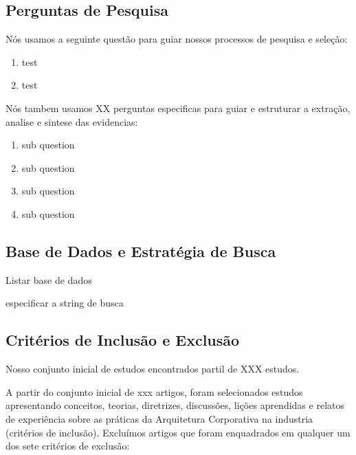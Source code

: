 \subsection{Perguntas de Pesquisa}
Nós usamos a seguinte questão para guiar nossos processos de pesquisa e seleção:

\begin{enumerate}
    \item test
    \item test
\end{enumerate}

Nós tambem usamos XX perguntas especificas para guiar e estruturar a extração, analise e sintese das evidencias:

\begin{enumerate}
    \item sub question
    \item sub question
    \item sub question
    \item sub question
\end{enumerate}

\subsection{Base de Dados e Estratégia de Busca}

Listar base de dados

especificar a string de busca

\subsection{Critérios de Inclusão e Exclusão}

Nosso conjunto inicial de estudos encontrados partil de XXX estudos. 

A partir do conjunto inicial de xxx artigos, foram selecionados estudos apresentando conceitos, teorias, diretrizes, discussões, lições aprendidas e relatos de experiência sobre as práticas da Arquitetura Corporativa na industria (critérios de inclusão). Excluímos artigos que foram enquadrados em qualquer um dos sete critérios de exclusão:

